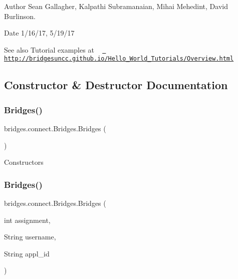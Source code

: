 \begin{DoxyAuthor}{Author}
Sean Gallagher, Kalpathi Subramanaian, Mihai Mehedint, David Burlinson.
\end{DoxyAuthor}
\begin{DoxyDate}{Date}
1/16/17, 5/19/17
\end{DoxyDate}
\begin{DoxySeeAlso}{See also}
Tutorial examples at ~\newline
 \href{http://bridgesuncc.github.io/Hello_World_Tutorials/Overview.html}{\texttt{ http\+://bridgesuncc.\+github.\+io/\+Hello\+\_\+\+World\+\_\+\+Tutorials/\+Overview.\+html}} 
\end{DoxySeeAlso}


\subsection{Constructor \& Destructor Documentation}
\mbox{\label{classbridges_1_1connect_1_1_bridges_a42f0592841a829f93453506c78951b1f}} 
\subsubsection{\texorpdfstring{Bridges()}{Bridges()}\hspace{0.1cm}{\footnotesize\ttfamily [1/2]}}
{\footnotesize\ttfamily bridges.\+connect.\+Bridges.\+Bridges (\begin{DoxyParamCaption}{ }\end{DoxyParamCaption})}

Constructors \mbox{\label{classbridges_1_1connect_1_1_bridges_a4c47eb7cbb94c5810dc38c38760db872}} 
\subsubsection{\texorpdfstring{Bridges()}{Bridges()}\hspace{0.1cm}{\footnotesize\ttfamily [2/2]}}
{\footnotesize\ttfamily bridges.\+connect.\+Bridges.\+Bridges (\begin{DoxyParamCaption}\item[{int}]{assignment,  }\item[{String}]{username,  }\item[{String}]{appl\+\_\+id }\end{DoxyParamCaption})}

